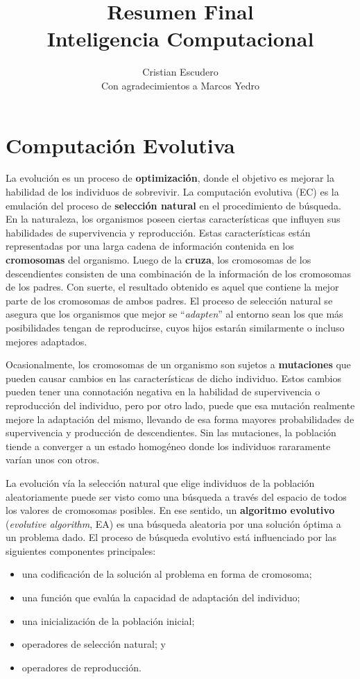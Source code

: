\documentclass[10pt,a4paper]{article}
\author{Cristian Escudero\\\small{Con agradecimientos a Marcos Yedro}}
\title{Resumen Final\\Inteligencia Computacional}
\begin{document}
\maketitle


\section{Computación Evolutiva}

La evolución es un proceso de \textbf{optimización}, donde el objetivo es mejorar la habilidad de los individuos de sobrevivir. La computación evolutiva (EC) es la emulación del proceso de \textbf{selección natural} en el procedimiento de búsqueda. En la naturaleza, los organismos poseen ciertas características que influyen sus habilidades de supervivencia y reproducción. Estas características están representadas por una larga cadena de información contenida en los \textbf{cromosomas} del organismo. Luego de la \textbf{cruza}, los cromosomas de los descendientes consisten de una combinación de la información de los cromosomas de los padres. Con suerte, el resultado obtenido es aquel que contiene la mejor parte de los cromosomas de ambos padres. El proceso de selección natural se asegura que los organismos que mejor se ``\textit{adapten}'' al entorno sean los que más posibilidades tengan de reproducirse, cuyos hijos estarán similarmente o incluso mejores adaptados.

Ocasionalmente, los cromosomas de un organismo son sujetos a \textbf{mutaciones} que pueden causar cambios en las características de dicho individuo. Estos cambios pueden tener una connotación negativa en la habilidad de supervivencia o reproducción del individuo, pero por otro lado, puede que esa mutación realmente mejore la adaptación del mismo, llevando de esa forma mayores probabilidades de supervivencia y producción de descendientes. Sin las mutaciones, la población tiende a converger a un estado homogéneo donde los individuos rararamente varían unos con otros.

La evolución vía la selección natural que elige individuos de la población aleatoriamente puede ser visto como una búsqueda a través del espacio de todos los valores de cromosomas posibles. En ese sentido, un \textbf{algoritmo evolutivo} (\textit{evolutive algorithm}, EA) es una búsqueda aleatoria por una solución óptima a un problema dado. El proceso de búsqueda evolutivo está influenciado por las siguientes componentes principales:
\begin{itemize}
\item una codificación de la solución al problema en forma de cromosoma;
\item una función que evalúa la capacidad de adaptación del individuo;
\item una inicialización de la población inicial;
\item operadores de selección natural; y 
\item operadores de reproducción.
\end{itemize}
\end{document}
